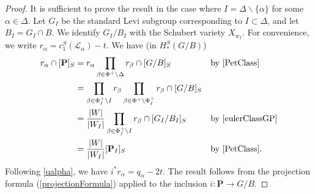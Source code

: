 \documentclass[10pt]{article}
\numberwithin{thm}{section}
\theoremstyle{definition}
\theoremstyle{remark}
\newcommand{\Pet}{\ensuremath{\mathbf{P}}}
\begin{document}
\begin{proof}
It is sufficient to prove the result in the case where $I=\Delta\backslash\{\alpha\}$ for some $\alpha\in\Delta$.
Let $G_I$ be the standard Levi subgroup corresponding to $I\subset\Delta$, and let $B_I=G_I\cap B$.
We identify $G_I/B_I$ with the Schubert variety $X_{w_I}$.
For convenience, we write $r_\alpha=c_1^S(\mathcal L_\alpha)-t$.
We have (in $H^S_*(G/B)$)
\begin{align*}
r_\alpha\cap[\Pet]_S
&=r_\alpha\prod\limits_{\beta\in\Phi^+\backslash\Delta} r_\beta\cap [G/B]_S
&&\text{by \cref{PetClass}}\\
&= \prod\limits_{\beta\in\Phi_I^+\backslash I}r_\beta\prod\limits_{\beta\in\Phi^+\backslash\Phi_I^+} r_\beta\cap [G/B]_S\\
&=\frac{|W|}{|W_I|} \prod\limits_{\beta\in\Phi_I^+\backslash I}r_\beta\cap[G_I/B_I]_S
&&\text{by \cref{eulerClassGP}}\\
&=\frac{|W|}{|W_I|}[\Pet_I]_S
&&\text{by \cref{PetClass}}.
\end{align*}
Following \cref{qalpha}, we have $i^*r_\alpha=q_\alpha-2t$.
The result follows from the projection formula (\cref{projectionFormula}) applied to the inclusion $i:\Pet\to G/B$.
\end{proof}
\end{document}
